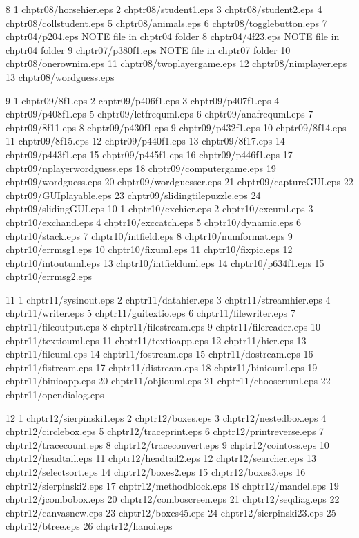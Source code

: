 8	1	chptr08/horsehier.eps
	2	chptr08/student1.eps
	3	chptr08/student2.eps
	4	chptr08/collstudent.eps
	5	chptr08/animals.eps
	6	chptr08/togglebutton.eps
	7	chptr04/p204.eps         NOTE file in chptr04 folder
	8	chptr04/4f23.eps         NOTE file in chptr04 folder
	9	chptr07/p380f1.eps       NOTE file in chptr07 folder
	10	chptr08/onerownim.eps
	11	chptr08/twoplayergame.eps
	12	chptr08/nimplayer.eps
	13	chptr08/wordguess.eps

9	1	chptr09/8f1.eps
	2	chptr09/p406f1.eps
	3	chptr09/p407f1.eps
	4	chptr09/p408f1.eps
	5	chptr09/letfrequml.eps
	6	chptr09/anafrequml.eps
	7	chptr09/8f11.eps
	8	chptr09/p430f1.eps
	9	chptr09/p432f1.eps
	10	chptr09/8f14.eps
	11	chptr09/8f15.eps
	12	chptr09/p440f1.eps
	13	chptr09/8f17.eps
	14	chptr09/p443f1.eps
	15	chptr09/p445f1.eps
	16	chptr09/p446f1.eps
	17	chptr09/nplayerwordguess.eps
	18	chptr09/computergame.eps
	19	chptr09/wordguess.eps
	20	chptr09/wordguesser.eps
	21	chptr09/captureGUI.eps
	22	chptr09/GUIplayable.eps
	23	chptr09/slidingtilepuzzle.eps
	24	chptr09/slidingGUI.eps
10	1	chptr10/exchier.eps
	2	chptr10/excuml.eps
	3	chptr10/exchand.eps
	4	chptr10/exccatch.eps
	5	chptr10/dynamic.eps
	6	chptr10/stack.eps
	7	chptr10/intfield.eps
	8	chptr10/numformat.eps
	9	chptr10/errmsg1.eps
	10	chptr10/fixuml.eps
	11	chptr10/fixpic.eps
	12	chptr10/intoutuml.eps
	13	chptr10/intfielduml.eps
	14	chptr10/p634f1.eps
	15	chptr10/errmsg2.eps

11	1	chptr11/sysinout.eps
	2	chptr11/datahier.eps
	3	chptr11/streamhier.eps
	4	chptr11/writer.eps
	5	chptr11/guitextio.eps
	6	chptr11/filewriter.eps
	7	chptr11/fileoutput.eps
	8	chptr11/filestream.eps
	9	chptr11/filereader.eps
	10	chptr11/textiouml.eps
	11	chptr11/textioapp.eps
	12	chptr11/hier.eps
	13	chptr11/fileuml.eps
	14	chptr11/fostream.eps
	15	chptr11/dostream.eps
	16	chptr11/fistream.eps
	17	chptr11/distream.eps
	18	chptr11/biniouml.eps
	19	chptr11/binioapp.eps
	20	chptr11/objiouml.eps
	21	chptr11/chooseruml.eps
	22	chptr11/opendialog.eps

12	1	chptr12/sierpinski1.eps
 	2	chptr12/boxes.eps
	3	chptr12/nestedbox.eps
	4	chptr12/circlebox.eps
	5	chptr12/traceprint.eps
	6	chptr12/printreverse.eps
	7	chptr12/tracecount.eps
	8	chptr12/traceconvert.eps
	9	chptr12/cointoss.eps
	10	chptr12/headtail.eps
	11	chptr12/headtail2.eps
	12	chptr12/searcher.eps
	13	chptr12/selectsort.eps
	14	chptr12/boxes2.eps
	15	chptr12/boxes3.eps
	16	chptr12/sierpinski2.eps
	17	chptr12/methodblock.eps
	18	chptr12/mandel.eps
	19	chptr12/jcombobox.eps
	20	chptr12/comboscreen.eps
	21	chptr12/seqdiag.eps
	22	chptr12/canvasnew.eps
	23	chptr12/boxes45.eps
	24	chptr12/sierpinski23.eps
	25	chptr12/btree.eps
	26	chptr12/hanoi.eps

